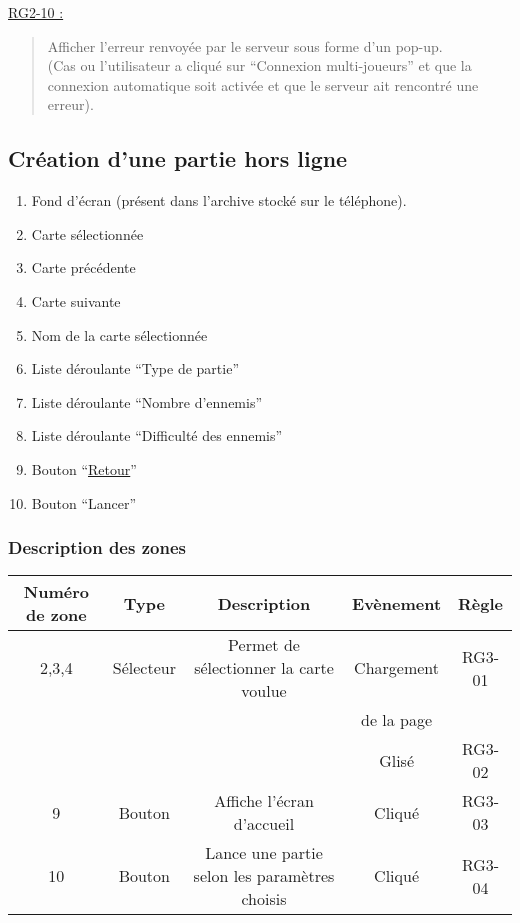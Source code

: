 \documentclass{report}
\begin{document}
		$\,$
				
		\underline{RG2-10 :}
			\begin{quote}
				Afficher l'erreur renvoyée par le serveur sous forme d'un pop-up.\\
				(Cas ou l'utilisateur a cliqué sur ``Connexion multi-joueurs'' et que la connexion automatique soit activée et que le serveur ait rencontré une erreur).
			\end{quote}
	
\newpage

	\subsection{Création d'une partie hors ligne}
	
		\hypertarget{Creer partie solo}{}
		\label{Creer partie solo}

		\begin{center}
					
		\end{center}
		
		\begin{enumerate}
		  \item Fond d'écran (présent dans l'archive stocké sur le téléphone).
		  \item Carte sélectionnée
		  \item Carte précédente
		  \item Carte suivante
		  \item Nom de la carte sélectionnée
		  \item Liste déroulante ``Type de partie''
		  \item Liste déroulante ``Nombre d'ennemis''
		  \item Liste déroulante ``Difficulté des ennemis''
		  \item Bouton ``\hyperlink{Accueil}{Retour}''
		  \item Bouton ``Lancer'' 
		\end{enumerate}
		
		\subsubsection{Description des zones}
		
			\begin{tabular}{|c|c|c|c|c|} \hline
				Numéro de zone & Type  & Description & Evènement &	Règle \\\hline
				2,3,4 & Sélecteur & Permet de sélectionner la carte voulue & Chargement & RG3-01 \\
				      &           &                                        & de la page & \\
				      &           &                                        & Glisé    & RG3-02 \\\hline
				9 & Bouton & Affiche l'écran d'accueil & Cliqué & RG3-03 \\\hline
				10& Bouton & Lance une partie selon les paramètres choisis & Cliqué & RG3-04 \\\hline
			\end{tabular}
\end{document}
